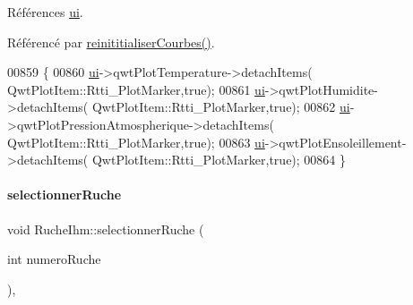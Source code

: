 Références \hyperlink{class_ruche_ihm_a64786058bd7f88ca2f1e9743bb27c25b}{ui}.



Référencé par \hyperlink{class_ruche_ihm_a098911c0edd701f7892e3d140ebffbd9}{reinititialiser\+Courbes()}.


\begin{DoxyCode}
00859 \{
00860     \hyperlink{class_ruche_ihm_a64786058bd7f88ca2f1e9743bb27c25b}{ui}->qwtPlotTemperature->detachItems( QwtPlotItem::Rtti\_PlotMarker,\textcolor{keyword}{true});
00861     \hyperlink{class_ruche_ihm_a64786058bd7f88ca2f1e9743bb27c25b}{ui}->qwtPlotHumidite->detachItems( QwtPlotItem::Rtti\_PlotMarker,\textcolor{keyword}{true});
00862     \hyperlink{class_ruche_ihm_a64786058bd7f88ca2f1e9743bb27c25b}{ui}->qwtPlotPressionAtmospherique->detachItems( QwtPlotItem::Rtti\_PlotMarker,\textcolor{keyword}{true});
00863     \hyperlink{class_ruche_ihm_a64786058bd7f88ca2f1e9743bb27c25b}{ui}->qwtPlotEnsoleillement->detachItems( QwtPlotItem::Rtti\_PlotMarker,\textcolor{keyword}{true});
00864 \}
\end{DoxyCode}
\mbox{\label{class_ruche_ihm_a7324ae6ea574ccdad47783f466933157}} 
\paragraph{\texorpdfstring{selectionner\+Ruche}{selectionnerRuche}}
{\footnotesize\ttfamily void Ruche\+Ihm\+::selectionner\+Ruche (\begin{DoxyParamCaption}\item[{int}]{numero\+Ruche }\end{DoxyParamCaption})\hspace{0.3cm}{\ttfamily [private]}, {\ttfamily [slot]}}



